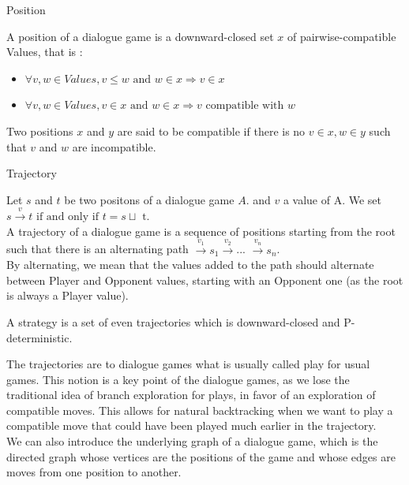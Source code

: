 \documentclass[a4paper,UKenglish]{lipics}
\begin{document}
\begin{definition}{Position}

A position of a dialogue game is a downward-closed set $x$ of pairwise-compatible Values, that is : 
\begin{itemize}
\item $\forall v,w \in Values, v\leq w \text{ and } w\in x \Rightarrow v \in x$
\item $\forall v,w \in Values,  v \in x \text{ and } w\in x \Rightarrow  v\text{ compatible with } w$\\

\end{itemize} 


Two positions $x$ and $y$ are said to be compatible if there is no $v \in x, w \in y$ such that $v$ and $w$ are incompatible.\\
\end{definition}
\begin{definition}{Trajectory}

Let $s$ and $t$ be two positons of a dialogue game $A$. and $v$ a value of A. We set $s \xrightarrow{v} t \text{ if and only if } t = s \sqcup \text{ t} $.\\

A trajectory of a dialogue game is a sequence of positions starting from the root such that there is an alternating path $ \xrightarrow{v_1} s_1 \xrightarrow{v_2} $... $\xrightarrow{v_n} s_n$.\\

By alternating, we mean that the values added to the path should alternate between Player and Opponent values, starting with an Opponent one (as the root is always a Player value).

A strategy is a set of even trajectories which is downward-closed and P-deterministic.
\end{definition}

The trajectories are to dialogue games what is usually called play for usual games. This notion is a key point of the dialogue games, as we lose the traditional idea of branch exploration for plays, in favor of an exploration of compatible moves. This allows for natural backtracking when we want to play a compatible move that could have been played much earlier in the trajectory.\\

We can also introduce the underlying graph of a dialogue game, which is the directed graph whose vertices are the positions of the game and whose edges are moves from one position to another.
\end{document}
